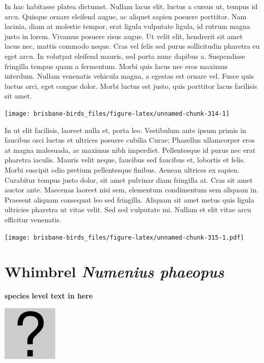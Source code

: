 \documentclass[]{book}
\let\origfigure\figure
\let\endorigfigure\endfigure
\renewenvironment{figure}[1][2] {
  \expandafter\origfigure\expandafter[H]
} {
  \endorigfigure
}
\begin{document}
In hac habitasse platea dictumst. Nullam lacus elit, luctus a cursus ut,
tempus id arcu. Quisque ornare eleifend augue, ac aliquet sapien posuere
porttitor. Nam lacinia, diam at molestie tempor, erat ligula vulputate
ligula, id rutrum magna justo in lorem. Vivamus posuere risus augue. Ut
velit elit, hendrerit sit amet lacus nec, mattis commodo neque. Cras vel
felis sed purus sollicitudin pharetra eu eget arcu. In volutpat eleifend
mauris, sed porta nunc dapibus a. Suspendisse fringilla tempus quam a
fermentum. Morbi quis lacus nec eros maximus interdum. Nullam venenatis
vehicula magna, a egestas est ornare vel. Fusce quis luctus orci, eget
congue dolor. Morbi luctus est justo, quis porttitor lacus facilisis sit
amet.

\begin{figure}
\texttt{[image: brisbane-birds\_files/figure-latex/unnamed-chunk-314-1]} \caption{insert figure caption}\label{fig:unnamed-chunk-314}
\end{figure}

In ut elit facilisis, laoreet nulla et, porta leo. Vestibulum ante ipsum
primis in faucibus orci luctus et ultrices posuere cubilia Curae;
Phasellus ullamcorper eros at magna malesuada, ac maximus nibh
imperdiet. Pellentesque id purus nec erat pharetra iaculis. Mauris velit
neque, faucibus sed faucibus et, lobortis et felis. Morbi suscipit odio
pretium pellentesque finibus. Aenean ultrices ex sapien. Curabitur
tempus justo dolor, sit amet pulvinar diam fringilla at. Cras sit amet
auctor ante. Maecenas laoreet nisi sem, elementum condimentum sem
aliquam in. Praesent aliquam consequat leo sed fringilla. Aliquam sit
amet metus quis ligula ultricies pharetra ut vitae velit. Sed sed
vulputate mi. Nullam et elit vitae arcu efficitur venenatis.

\begin{figure}
\centering
\texttt{[image: brisbane-birds\_files/figure-latex/unnamed-chunk-315-1.pdf]}
\caption{\label{fig:unnamed-chunk-315}insert figure caption}
\end{figure}

\section{\texorpdfstring{Whimbrel \emph{Numenius
phaeopus}}{Whimbrel Numenius phaeopus}}\label{whimbrel-numenius-phaeopus}

\textbf{species level text in here}

\begin{figure}
\centering
\includegraphics{assets/missing.png}
\caption{No image for species}
\end{figure}
\end{document}
